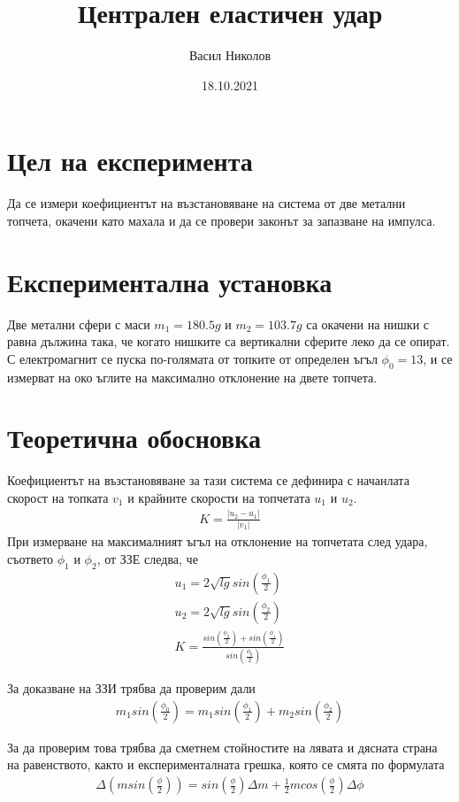 \documentclass[aps, prb, twocolumn, a4paper]{revtex4-2}
\begin{document}
\title{Централен еластичен удар}
\author{Васил Николов}
\date{18.10.2021}
\maketitle

\section{Цел на експеримента}
Да се измери коефициентът на възстановяване на система от две метални топчета, окачени като махала и да се провери законът за запазване на импулса.

\section{Експериментална установка}
Две метални сфери с маси $m_1 = 180.5 g$ и $m_2=103.7 g$ са окачени на нишки с равна дължина така, че когато нишките са вертикални сферите леко да се опират. С електромагнит се пуска по-голямата от топките от определен ъгъл $\phi_0 = 13$\textdegree, и се измерват на око ъглите на максимално отклонение на двете топчета.

\section{Теоретична обосновка}
Коефициентът на възстановяване за тази система се дефинира с начанлата скорост на топката $v_1$ и крайните скорости на топчетата $u_1$ и $u_2$.
\begin{gather*}
    K=\frac{|u_2 - u_1|}{|v_1|}
\end{gather*}
При измерване на максималният ъгъл на отклонение на топчетата след удара, съответо $\phi_1$ и $\phi_2$, от ЗЗЕ следва, че 
\begin{gather*}
    u_1 = 2\sqrt{lg}sin(\frac{\phi_1}{2}) \\
    u_2 = 2\sqrt{lg}sin(\frac{\phi_2}{2}) \\
    K = \frac{sin(\frac{\phi_2}{2}) + sin(\frac{\phi_1}{2})}{sin(\frac{\phi_0}{2})} \tag{1}
\end{gather*}

За доказване на ЗЗИ трябва да проверим дали 
\begin{gather*}
    m_1sin(\frac{\phi_0}{2}) = m_1sin(\frac{\phi_1}{2}) + m_2sin(\frac{\phi_2}{2}) \tag{2}
\end{gather*}

За да проверим това трябва да сметнем стойностите на лявата и дясната страна на равенството, както и експерименталната грешка, която се смята по формулата
\begin{gather*}
    \Delta(msin(\frac{\phi}{2})) = sin(\frac{\phi}{2})\Delta m + \frac{1}{2}mcos(\frac{\phi}{2})\Delta \phi
\end{gather*}
\end{document}
